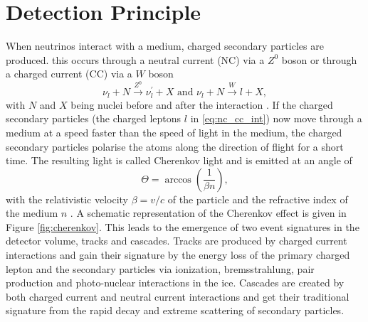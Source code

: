 \section{Detection Principle}

When neutrinos interact with a medium, charged secondary particles are produced.
this occurs through a neutral current (NC) via a $Z^0$ boson or through a charged current (CC) via a $W$ boson
\begin{equation}
  \nu_l + N \xrightarrow{Z^0} \nu^{\prime}_l + X \text{ and }  \nu_l + N \xrightarrow{W} l + X, \label{eq:nc_cc_int}
\end{equation}
with $N$ and $X$ being nuclei before and after the interaction \cite{Ahlers_2018}.
If the charged secondary particles (the charged leptons $l$ in \eqref{eq:nc_cc_int}) now move through a medium at a speed faster than the speed of light in the medium, the charged secondary particles polarise the atoms along the direction of flight for a short time.
The resulting light is called Cherenkov light and is emitted at an angle of
\begin{equation}
  \Theta = \arccos{\left(\frac{1}{\beta n}\right)}, \label{eq:cherenkov}
\end{equation}
with the relativistic velocity $\beta=v/c$ of the particle and the refractive index of the medium $n$ \cite{PhysRev52378,spiering}.
A schematic representation of the Cherenkov effect is given in Figure \ref{fig:cherenkov}.
This leads to the emergence of two event signatures in the detector volume, tracks and cascades.
Tracks are produced by charged current interactions and gain their signature by the energy loss of the primary charged lepton and the secondary particles via ionization, bremsstrahlung, pair production and photo-nuclear interactions in the ice.
Cascades are created by both charged current and neutral current interactions and get their traditional signature from the rapid decay and extreme scattering of secondary particles.
